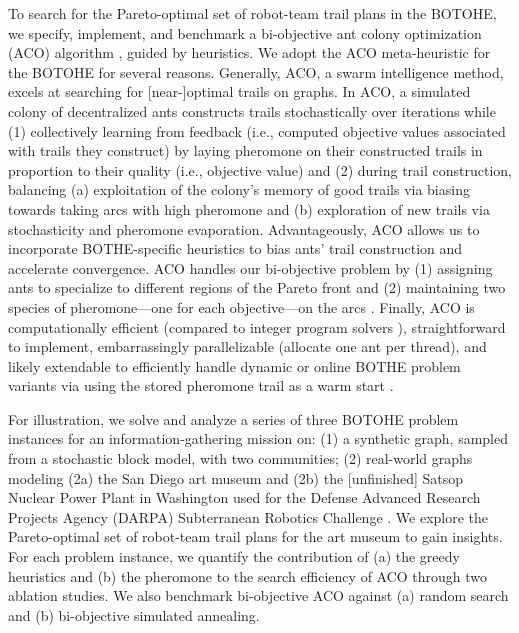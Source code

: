 \documentclass[fleqn,10pt,lineno]{wlpeerj}
\begin{document}
To search for the Pareto-optimal set of robot-team trail plans in the BOTOHE, we specify, implement, and benchmark a bi-objective ant colony optimization (ACO) algorithm \cite{iredi2001bi}, guided by heuristics.
We adopt the ACO meta-heuristic \cite{dorigo2006ant,bonabeau1999swarm,blum2005ant} for the BOTOHE for several reasons.
Generally, ACO, a swarm intelligence method, excels at searching for [near-]optimal trails on graphs.
In ACO, a simulated colony of decentralized ants constructs trails stochastically over iterations while 
(1) collectively learning from feedback (i.e., computed objective values associated with trails they construct) by laying pheromone on their constructed trails in proportion to their quality (i.e., objective value) and
(2) during trail construction, balancing 
(a) exploitation of the colony's memory of good trails via biasing towards taking arcs with high pheromone and 
(b) exploration of new trails via stochasticity and pheromone evaporation.
Advantageously, ACO allows us to incorporate BOTHE-specific heuristics to bias ants' trail construction and accelerate convergence.
ACO handles our bi-objective problem by (1) assigning ants to specialize to different regions of the Pareto front and (2) maintaining two species of pheromone---one for each objective---on the arcs \cite{iredi2001bi}.
Finally, ACO is computationally efficient (compared to integer program solvers \cite{pascariu2021train}), straightforward to implement, embarrassingly parallelizable (allocate one ant per thread), and likely extendable to efficiently handle dynamic or online BOTHE problem variants via using the stored pheromone trail as a warm start \cite{montemanni2005ant}.

For illustration, we solve and analyze a series of three BOTOHE problem instances for an information-gathering mission on:
(1) a synthetic graph, sampled from a stochastic block model, with two communities;
(2) real-world graphs modeling (2a) the San Diego art museum and (2b) the [unfinished] Satsop Nuclear Power Plant in Washington used for the  Defense Advanced Research Projects Agency (DARPA) Subterranean Robotics Challenge \cite{ackerman2022robots,orekhov2022darpa}.
We explore the Pareto-optimal set of robot-team trail plans for the art museum to gain insights.
For each problem instance, we quantify the contribution of (a) the greedy heuristics and (b) the pheromone to the search efficiency of ACO through two ablation studies. We also benchmark bi-objective ACO against (a) random search and (b) bi-objective simulated annealing.
\end{document}
